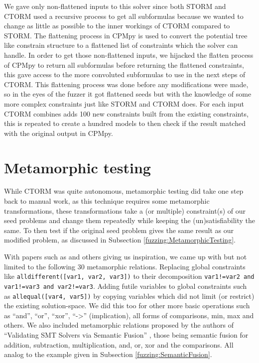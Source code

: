 We gave only non-flattened inputs to this solver since both STORM and CTORM used a recursive process to get all subformulas because we wanted to change as little as possible to the inner workings of CTORM compared to STORM. The flattening process in CPMpy is used to convert the potential tree like constrain structure to a flattened list of constraints which the solver can handle. 
In order to get those non-flattened inputs, we hijacked the flatten process of CPMpy to return all subformulas before returning the flattened constraints, this gave access to the more convoluted subformulas to use in the next steps of CTORM. This flattening process was done before any modifications were made, so in the eyes of the fuzzer it got flattened seeds but with the knowledge of some more complex constraints just like STORM and CTORM does. For each input CTORM combines adds 100 new constraints built from the existing constraints, this is repeated to create a hundred models to then check if the result matched with the original output in CPMpy.

%


\section{Metamorphic testing}
\label{impl:Meta}
While CTORM was quite autonomous, metamorphic testing did take one step back to manual work, as this technique requires some metamorphic transformations, these transformations take a (or multiple) constraint(s) of our seed problems and change them repeatedly while keeping the (un)satisfiability the same. To then test if the original seed problem gives the same result as our modified problem, as discussed in Subsection \ref{fuzzing:MetamorphicTesting}. 

With papers such as \cite{50akgun2018metamorphic, 49usman2020testmc, 43YinYang} and others giving us inspiration, we came up with but not limited to the following 30 metamorphic relations. Replacing global constraints like \texttt{alldifferent([var1, var2, var3])} to their decomposition \texttt{var1!=var2 and var1!=var3 and var2!=var3}. Adding futile variables to global constraints such as \texttt{allequal([var4, var5])} by copying variables which did not limit (or restrict) the existing solution-space. We did this too for other more basic operations such as “and”, “or”, “xor”, “->” (implication), all forms of comparisons, min, max and others. We also included metamorphic relations proposed by the authors of “Validating SMT Solvers via Semantic Fusion” \cite{43YinYang}, those being semantic fusion for addition, subtraction, multiplication, and, or, xor and the comparisons. All analog to the example given in Subsection \ref{fuzzing:SemanticFusion}. 

